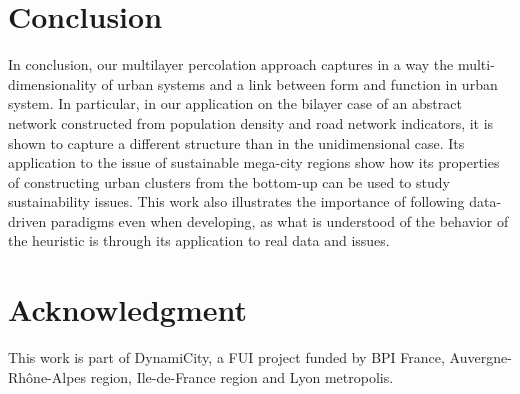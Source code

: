 \documentclass{jimis-en}
\begin{document}
  

\section{Conclusion}


In conclusion, our multilayer percolation approach captures in a way the multi-dimensionality of urban systems and a link between form and function in urban system. In particular, in our application on the bilayer case of an abstract network constructed from population density and road network indicators, it is shown to capture a different structure than in the unidimensional case. Its application to the issue of sustainable mega-city regions show how its properties of constructing urban clusters from the bottom-up can be used to study sustainability issues. This work also illustrates the importance of following data-driven paradigms even when developing, as what is understood of the behavior of the heuristic is through its application to real data and issues.



\section*{Acknowledgment}

This work is part of DynamiCity, a FUI project funded by BPI France, Auvergne-Rh{\^o}ne-Alpes region, Ile-de-France region and Lyon metropolis.
\end{document}
